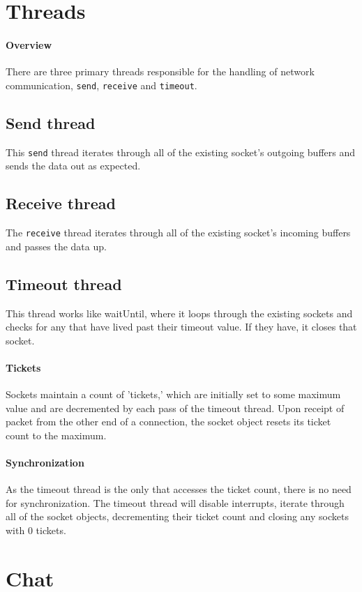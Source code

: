 \documentclass[]{article}
\begin{document}
\section{Threads}
\paragraph{Overview}
There are three primary threads responsible for the handling of network communication, \texttt{send}, \texttt{receive} and \texttt{timeout}.

\subsection{Send thread}
This \texttt{send} thread iterates through all of the existing socket's outgoing buffers and sends the data out as expected.
\subsection{Receive thread}
The \texttt{receive} thread iterates through all of the existing socket's incoming buffers and passes the data up.

\subsection{Timeout thread}
This thread works like waitUntil, where it loops through the existing sockets and checks for any that have lived past their timeout value. If they have, it closes that socket.

\paragraph{Tickets}
Sockets maintain a count of 'tickets,' which are initially set to some maximum value and are decremented by each pass of the timeout thread. Upon receipt of packet from the other end of a connection, the socket object resets its ticket count to the maximum.

\paragraph{Synchronization}
As the timeout thread is the only that accesses the ticket count, there is no need for synchronization. The timeout thread will disable interrupts, iterate through all of the socket objects, decrementing their ticket count and closing any sockets with 0 tickets.

\section{Chat}
\end{document}
